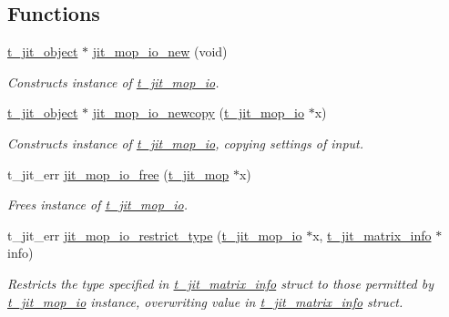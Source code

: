 \subsection*{Functions}
\begin{DoxyCompactItemize}
\item 
\hyperlink{structt__object}{t\_\-jit\_\-object} $\ast$ \hyperlink{group__mopmod_gade67016225c12a230ee31e0d78f838b2}{jit\_\-mop\_\-io\_\-new} (void)
\begin{DoxyCompactList}\small\item\em Constructs instance of \hyperlink{structt__jit__mop__io}{t\_\-jit\_\-mop\_\-io}. \item\end{DoxyCompactList}\item 
\hyperlink{structt__object}{t\_\-jit\_\-object} $\ast$ \hyperlink{group__mopmod_gabf7dab18444e7085ad858753e51a467c}{jit\_\-mop\_\-io\_\-newcopy} (\hyperlink{structt__jit__mop__io}{t\_\-jit\_\-mop\_\-io} $\ast$x)
\begin{DoxyCompactList}\small\item\em Constructs instance of \hyperlink{structt__jit__mop__io}{t\_\-jit\_\-mop\_\-io}, copying settings of input. \item\end{DoxyCompactList}\item 
t\_\-jit\_\-err \hyperlink{group__mopmod_gaad1c85a891e17b271edf23eac393d1f7}{jit\_\-mop\_\-io\_\-free} (\hyperlink{structt__jit__mop}{t\_\-jit\_\-mop} $\ast$x)
\begin{DoxyCompactList}\small\item\em Frees instance of \hyperlink{structt__jit__mop__io}{t\_\-jit\_\-mop\_\-io}. \item\end{DoxyCompactList}\item 
t\_\-jit\_\-err \hyperlink{group__mopmod_ga9f85cf8513ff75fabea615619686e84f}{jit\_\-mop\_\-io\_\-restrict\_\-type} (\hyperlink{structt__jit__mop__io}{t\_\-jit\_\-mop\_\-io} $\ast$x, \hyperlink{structt__jit__matrix__info}{t\_\-jit\_\-matrix\_\-info} $\ast$info)
\begin{DoxyCompactList}\small\item\em Restricts the type specified in \hyperlink{structt__jit__matrix__info}{t\_\-jit\_\-matrix\_\-info} struct to those permitted by \hyperlink{structt__jit__mop__io}{t\_\-jit\_\-mop\_\-io} instance, overwriting value in \hyperlink{structt__jit__matrix__info}{t\_\-jit\_\-matrix\_\-info} struct. \item\end{DoxyCompactList}\item 

\end{DoxyCompactItemize}
